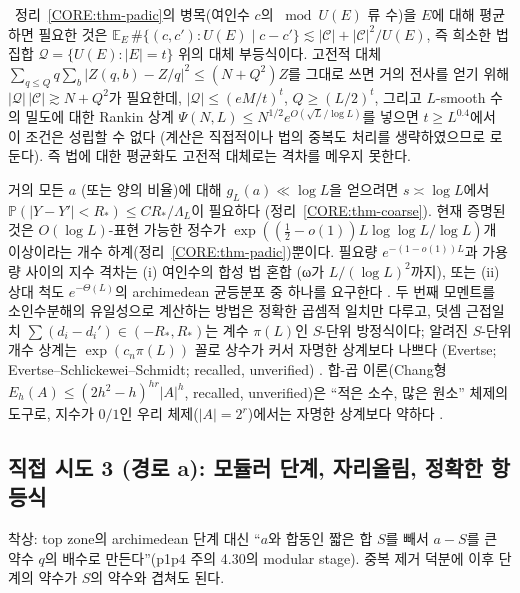 \begin{remark}\label{CORE:rem-largesieve}
\HEUR\ 정리~\ref{CORE:thm-padic}의 병목(여인수 $c$의 $\bmod U(E)$ 류 수)을 $E$에 대해 평균하면 필요한 것은 $\mathbb E_E\,\#\{(c,c'):U(E)\mid c-c'\}\lesssim|\mathcal C|+|\mathcal C|^2/U(E)$, 즉 희소한 법 집합 $\mathcal Q=\{U(E):|E|=t\}$ 위의 대체 부등식이다. 고전적 대체 $\sum_{q\le Q}q\sum_b|Z(q,b)-Z/q|^2\le(N+Q^2)Z$를 그대로 쓰면 거의 전사를 얻기 위해 $|\mathcal Q|\,|\mathcal C|\gtrsim N+Q^2$가 필요한데, $|\mathcal Q|\le(eM/t)^t$, $Q\ge(L/2)^t$, 그리고 $L$-smooth 수의 밀도에 대한 Rankin 상계 $\Psi(N,L)\le N^{1/2}e^{O(\sqrt L/\log L)}$를 넣으면 $t\ge L^{0.4}$에서 이 조건은 성립할 수 없다 (계산은 직접적이나 법의 중복도 처리를 생략하였으므로 \HEUR{}로 둔다). 즉 법에 대한 평균화도 고전적 대체로는 격차를 메우지 못한다.
\end{remark}

\begin{remark}[경로 c의 정확한 실패 지점]\label{CORE:rem-routec-fail}
거의 모든 $a$ (또는 양의 비율)에 대해 $g_L(a)\ll\log L$을 얻으려면 $s\asymp\log L$에서 $\mathbb P(|Y-Y'|<R_*)\le C R_*/\Lambda_L$이 필요하다 (정리~\ref{CORE:thm-coarse}). 현재 증명된 것은 $O(\log L)$-표현 가능한 정수가 $\exp((\frac12-o(1))L\log\log L/\log L)$개 이상이라는 개수 하계(정리~\ref{CORE:thm-padic})뿐이다. 필요량 $e^{-(1-o(1))L}$과 가용량 사이의 지수 격차는 (i) 여인수의 합성 법 혼합 (ω가 $L/(\log L)^2$까지), 또는 (ii) 상대 척도 $e^{-\Theta(L)}$의 archimedean 균등분포 중 하나를 요구한다 \OPEN. 두 번째 모멘트를 소인수분해의 유일성으로 계산하는 방법은 정확한 곱셈적 일치만 다루고, 덧셈 근접일치 $\sum(d_i-d_i')\in(-R_*,R_*)$는 계수 $\pi(L)$인 $S$-단위 방정식이다; 알려진 $S$-단위 개수 상계는 $\exp(c_n\pi(L))$ 꼴로 상수가 커서 자명한 상계보다 나쁘다 (Evertse; Evertse–Schlickewei–Schmidt; recalled, unverified) \HEUR. 합-곱 이론(Chang형 $E_h(A)\le(2h^2-h)^{hr}|A|^h$, recalled, unverified)은 ``적은 소수, 많은 원소'' 체제의 도구로, 지수가 $0/1$인 우리 체제($|A|=2^r$)에서는 자명한 상계보다 약하다 \HEUR.
\end{remark}

\subsection{직접 시도 3 (경로 a): 모듈러 단계, 자리올림, 정확한 항등식}
\label{CORE:ssec-routea}

착상: top zone의 archimedean 단계 대신 ``$a$와 합동인 짧은 합 $S$를 빼서 $a-S$를 큰 약수 $q$의 배수로 만든다''(p1p4 주의 4.30의 modular stage). 중복 제거 덕분에 이후 단계의 약수가 $S$의 약수와 겹쳐도 된다.

